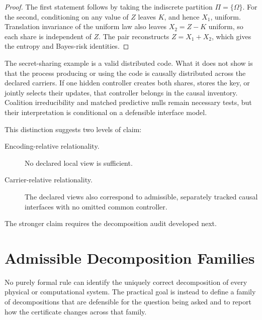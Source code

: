 \begin{proof}
The first statement follows by taking the indiscrete partition
\(\Pi=\{\Omega\}\). For the second, conditioning on any value of \(Z\) leaves
\(K\), and hence \(X_1\), uniform. Translation invariance of the uniform law
also leaves \(X_2=Z-K\) uniform, so each share is independent of \(Z\). The
pair reconstructs \(Z=X_1+X_2\), which gives the entropy and Bayes-risk
identities.
\end{proof}

The secret-sharing example is a valid distributed code. What it does not show
is that the process producing or using the code is causally distributed across
the declared carriers. If one hidden controller creates both shares, stores
the key, or jointly selects their updates, that controller belongs in the
causal inventory. Coalition irreducibility and matched predictive nulls remain
necessary tests, but their interpretation is conditional on a defensible
interface model.

This distinction suggests two levels of claim:
\begin{description}
\item[Encoding-relative relationality.] No declared local view is sufficient.
\item[Carrier-relative relationality.] The declared views also correspond to
admissible, separately tracked causal interfaces with no omitted common
controller.
\end{description}
The stronger claim requires the decomposition audit developed next.

\section{Admissible Decomposition Families}

No purely formal rule can identify the uniquely correct decomposition of every
physical or computational system. The practical goal is instead to define a
family of decompositions that are defensible for the question being asked and
to report how the certificate changes across that family.

